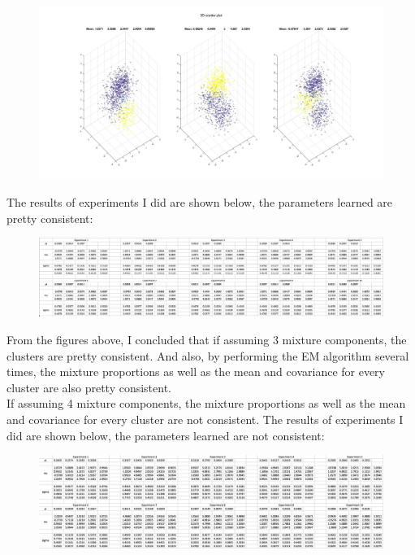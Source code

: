 \documentclass[a4paper]{article}
\begin{document}
\begin{spacing}{2.0}
\begin{enumerate}[(1)]
\begin{figure}[H]
\centering
\includegraphics[width = 6in]{scatter3d.jpg}
\end{figure}

The results of experiments I did are shown below, the parameters  learned are pretty consistent:
\begin{figure}[H]
\centering
\includegraphics[width = 7in]{EM3.jpg}
\end{figure}

From the figures above, I concluded that if assuming 3 mixture components, the clusters are pretty consistent. And also, by performing the EM algorithm several times, the mixture proportions as well as the mean and covariance for every cluster are also pretty consistent.\\
If assuming 4 mixture components, the mixture proportions as well as the mean and covariance for every cluster are not consistent. The results of experiments I did are shown below, the parameters  learned are not consistent:
\begin{figure}[H]
\centering
\includegraphics[width = 7in]{EM4.jpg}
\end{figure}


\end{enumerate}
\end{spacing}
\end{document}
